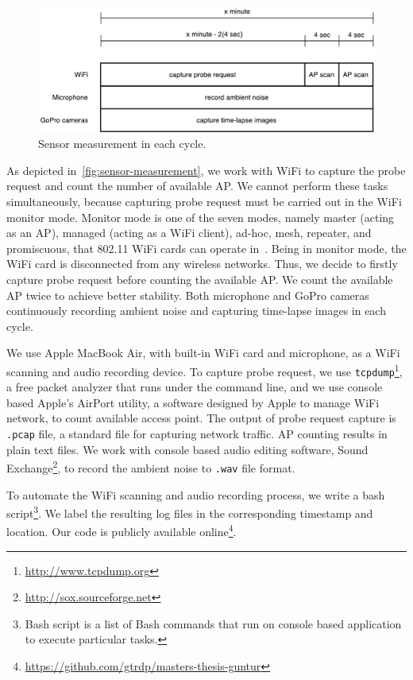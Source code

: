 \begin{figure}[ht]
	\centering
	\includegraphics[width=\textwidth]{./img/3-scanning-mechanism}
	\caption{Sensor measurement in each cycle.}
	\label{fig:sensor-measurement}
\end{figure}

As depicted in~\autoref{fig:sensor-measurement}, we work with WiFi to capture the probe request and count the number of available \ac{AP}. We cannot perform these tasks simultaneously, because capturing probe request must be carried out in the WiFi monitor mode. Monitor mode is one of the seven modes, namely master (acting as an \ac{AP}), managed (acting as a WiFi client), ad-hoc, mesh, repeater, and promiscuous, that 802.11 WiFi cards can operate in~\cite{thesis082}. Being in monitor mode, the WiFi card is disconnected from any wireless networks. Thus, we decide to firstly capture probe request before counting the available \ac{AP}. We count the available \ac{AP} twice to achieve better stability. Both microphone and GoPro cameras continuously recording ambient noise and capturing time-lapse images in each cycle.

We use Apple MacBook Air, with built-in WiFi card and microphone, as a WiFi scanning and audio recording device. To capture probe request, we use \verb|tcpdump|\footnote{\url{http://www.tcpdump.org}}, a free packet analyzer that runs under the command line, and we use console based Apple's AirPort utility, a software designed by Apple to manage WiFi network, to count available access point. The output of probe request capture is \verb|.pcap| file, a standard file for capturing network traffic. \ac{AP} counting results in plain text files. We work with console based audio editing software, Sound Exchange\footnote{\url{http://sox.sourceforge.net}}, to record the ambient noise to \verb|.wav| file format.

To automate the WiFi scanning and audio recording process, we write a bash script\footnote{Bash script is a list of Bash commands that run on console based application to execute particular tasks.}. We label the resulting log files in the corresponding timestamp and location. Our code is publicly available online\footnote{\url{https://github.com/gtrdp/masters-thesis-guntur}}.













